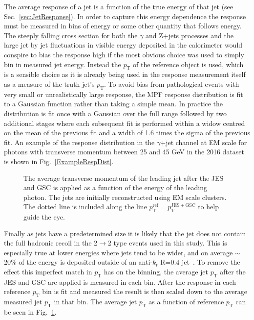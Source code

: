 The average response of a jet is a function of the true energy of that jet (see Sec.~\ref{sec:JetResponse}).  
In order to capture this energy dependence the response must be measured in bins of energy or some other quantity that follows energy.  
The steeply falling cross section for both the $\gamma$ and Z+jets processes and the large jet by jet fluctuations in visible energy deposited in the calorimeter would conspire to bias the response high if the most obvious choice was used to simply bin in measured jet energy.  
Instead the $p_{\mathrm T}$ of the reference object is used, which is a sensible choice as it is already being used in the response measurement itself as a measure of the truth jet's $p_{\mathrm T}$.  
To avoid bias from pathological events with very small or unrealistically large response, the MPF response distribution is fit to a Gaussian function rather than taking a simple mean.  
In practice the distribution is fit once with a Gaussian over the full range followed by two additional stages where each subsequent fit is performed within a widow centred on the mean of the previous fit and a width of 1.6 times the sigma of the previous fit.  
An example of the response distribution in the $\gamma$+jet channel at EM scale for photons with transverse momentum between 25 and 45 GeV in the 2016 dataset is shown in Fig.~\ref{ExampleRespDist}.  

\begin{figure}[!ht]
\begin{center}
\end{center}
\caption[Average measured jet momentum Vs. refence $p_{\mathrm T}$]
{\small The average transverse momentum of the leading jet after the JES and GSC is applied as a function of the energy of the leading photon.  The jets are initially reconstructed using EM scale clusters.  The dotted line is included along the line $p_{\mathrm T}^{\mathrm {ref}}=p_{\mathrm T}^{\mathrm{JES+GSC}}$ to help guide the eye.}
\label{plot:MappingExample}
\end{figure}


Finally as jets have a predetermined size it is likely that the jet does not contain the full hadronic recoil in the 2$\rightarrow$2 type events used in this study.  
This is especially true at lower energies where jets tend to be wider, and on average $\sim$20\% of the energy is deposited outside of an anti-$k_t$ R=0.4 jet~\cite{ATLAS-CONF-2015-057}.  
To remove the effect this imperfect match in $p_{\mathrm T}$ has on the binning, the average jet $p_{\mathrm T}$ after the JES and GSC are applied is measured in each bin.  
After the response in each reference $p_{\mathrm T}$ bin is fit and measured the result is then scaled down to the average measured jet $p_{\mathrm T}$ in that bin.  
The average jet $p_{\mathrm T}$ as a function of reference $p_{\mathrm T}$ can be seen in Fig.~\ref{plot:MappingExample}.  

